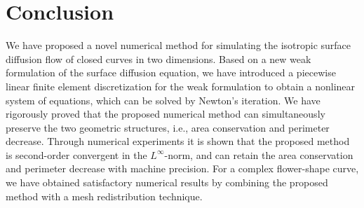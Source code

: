 \documentclass[review]{elsarticle}
\begin{document}
\section{Conclusion}

We have proposed a novel numerical method for simulating the isotropic surface diffusion flow of closed curves in two dimensions. Based on a new weak formulation of the surface diffusion equation, we have introduced a piecewise linear finite element discretization for the weak formulation to obtain a nonlinear system of equations, which can be solved by Newton's iteration.
We have rigorously proved that the proposed numerical method can simultaneously preserve the two geometric structures, i.e., area conservation and perimeter decrease. Through numerical experiments it is shown that the proposed method is second-order convergent in the $L^{\infty}$-norm, and can retain the area conservation and perimeter decrease with machine precision.
For a complex flower-shape curve,
we have obtained satisfactory numerical results by combining the proposed method with a mesh redistribution technique.
\end{document}
